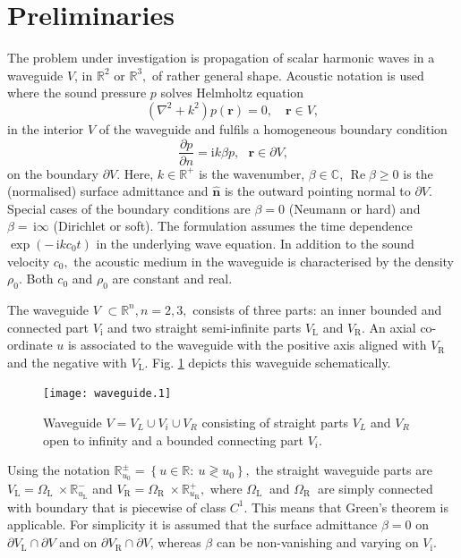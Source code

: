 \documentclass[numreferences]{kluwer}
\renewcommand{\Re}{\operatorname{Re}}
\renewcommand{\i}{\,\mathrm{i}}
\begin{document}
\section{Preliminaries}
\label{sec:prel}

The problem under investigation is propagation of scalar harmonic
waves in a waveguide $V$, in $\mathbb{R}^{2}$ or $\mathbb{R}^{3},$ of
rather general shape. Acoustic notation is used where the sound
pressure $p$ solves Helmholtz equation%
\begin{equation}
  (\nabla^{2}+k^{2})p(\bm{r})=0,\quad\bm{r}\in V, \label{101}%
\end{equation}
in the interior $V$ of the waveguide and fulfils a homogeneous
boundary condition%
\begin{equation}
  \dfrac{\partial p}{\partial n}=\text{i}k\beta p,
  \text{ }\bm{r}\in\partial V\text{,} \label{102}%
\end{equation}
on the boundary $\partial V$. Here, $k\in\mathbb{R}^{+}$ is the
wavenumber, $\beta\in\mathbb{C}$, $\Re\beta\geq0$ is the (normalised)
surface admittance and $\widehat{\bm{n}}$ is the outward pointing
normal to $\partial V$. Special cases of the boundary conditions are
$\beta=0$ (Neumann or hard) and $\beta=\i\infty$ (Dirichlet or
soft). The formulation assumes the time dependence $\exp(-\i kc_{0}t)$
in the underlying wave equation. In addition to the sound velocity
$c_{0},$ the acoustic medium in the waveguide is characterised by the
density $\rho_{0}.$ Both $c_{0}$ and $\rho_{0}$ are constant and real.

The waveguide $V$ $\subset\mathbb{R}^{n},n=2,3,$ consists of three
parts: an inner bounded and connected part $V_{\text{i}}$ and two
straight semi-infinite parts $V_{\text{L}}$ and $V_{\text{R}}$. An
axial co-ordinate $u$ is associated to the waveguide with the positive
axis aligned with $V_{\text{R}}$ and the negative with $V_{\text{L}}.$
Fig.  \ref{fig:wg1} depicts this waveguide schematically.%
\begin{figure}[htb]
  \centering
  \texttt{[image: waveguide.1]}
  \caption{Waveguide $V=V_L\cup V_i\cup V_R$ consisting of straight
    parts $V_L$ and $V_R$ open to infinity and a bounded connecting
    part $V_i$.}
  \label{fig:wg1}
\end{figure}
Using the notation $\mathbb{R}_{u_0}^{\pm}=\left\{ u\in\mathbb{R}:\
  u\gtrless u_{0}\right\} ,$ the straight waveguide parts are
$V_{\text{L}%
}=\Omega_{\text{L }}\times\mathbb{R}_{u_{\text{L}}}^{-}$ and
$V_{\text{R}%
}=\Omega_{\text{R }}\times\mathbb{R}_{u_{\text{R}}}^{+},$ where
$\Omega _{\text{L }}$ and $\Omega_{\text{R }}$ are simply connected
with boundary that is piecewise of class $C^{1}.$ This means that
Green's theorem is applicable.  For simplicity it is assumed that the
surface admittance $\beta=0$ on $\partial V_{\text{L}}\cap\partial V$
and on $\partial V_{\text{R}}\cap\partial V$, whereas $\beta$ can be
non-vanishing and varying on $V_{\text{i}}.$
\end{document}
